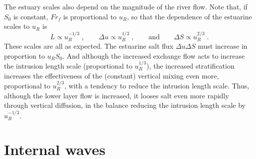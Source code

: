 \documentclass[11pt]{report}
\numberwithin{equation}{section}
\begin{document}
The estuary scales also depend on the magnitude of the river flow.  Note that, if $S_0$ is constant, $Fr_f$ is proportional to $u_R$, so that the dependence of the estuarine scales to $u_R$ is
\begin{equation}
    L \propto u_R^{-1/3} \; , \qquad \Delta u \propto u_R^{1/3} \;, \qquad \mathrm{and} \qquad \Delta S \propto u_R^{2/3}   \;.
\end{equation}
These scales are all as expected.  The estuarine salt flux $\Delta u \Delta S$ must increase in proportion to $u_R S_0$.  And although the increased exchange flow acts to increase the intrusion length scale (proportional to $u_R^{1/3}$), the increased stratification increases the effectiveness of the (constant) vertical mixing even more, proportional to $u_R^{2/3}$, with a tendency to reduce the intrusion length scale.  Thus, although the lower layer flow is increased, it looses salt even more rapidly through vertical diffusion, in the balance reducing the intrusion length scale by $u_R^{-1/3}$.





\section{Internal waves}
\end{document}
